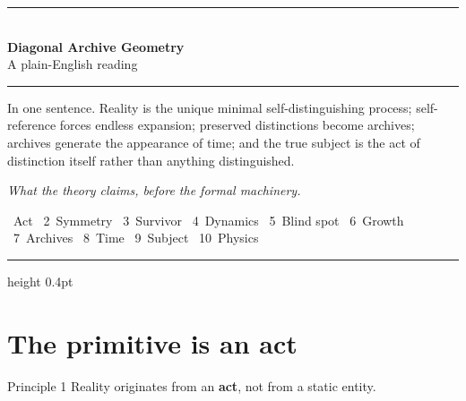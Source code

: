 \documentclass[11pt,a4paper]{article}
\newcommand{\term}[1]{\textbf{#1}}
\begin{document}
\begin{center}
  {\color{rule}\rule{0.55\textwidth}{0.6pt}}\\[0.9em]
  {\sffamily\LARGE\bfseries\color{accent} Diagonal Archive Geometry}\\[0.45em]
  {\large\color{muted} A plain-English reading}\\[0.7em]
  {\color{rule}\rule{0.35\textwidth}{0.4pt}}
\end{center}

\vspace{0.35em}

\begin{epigraphbox}
In one sentence.\quad
Reality is the unique minimal self-distinguishing process;
self-reference forces endless expansion;
preserved distinctions become archives;
archives generate the appearance of time;
and the true subject is the act of distinction itself
rather than anything distinguished.
\end{epigraphbox}

\vspace{0.25em}
\begin{center}
  {\color{muted}\small\textit{What the theory claims, before the formal machinery.}}
\end{center}

\vspace{0.4em}
{\color{muted}\small{}~Act \textperiodcentered\
2~Symmetry \textperiodcentered\
3~Survivor \textperiodcentered\
4~Dynamics \textperiodcentered\
5~Blind spot \textperiodcentered\
6~Growth \textperiodcentered\
7~Archives \textperiodcentered\
8~Time \textperiodcentered\
9~Subject \textperiodcentered\
10~Physics
}

\vspace{0.3em}
{\color{rule}\hrule height 0.4pt}
\vspace{0.5em}

\section{The primitive is an act}

\begin{principle}{Principle 1}
Reality originates from an \term{act}, not from a static entity.
\end{principle}
\end{document}
